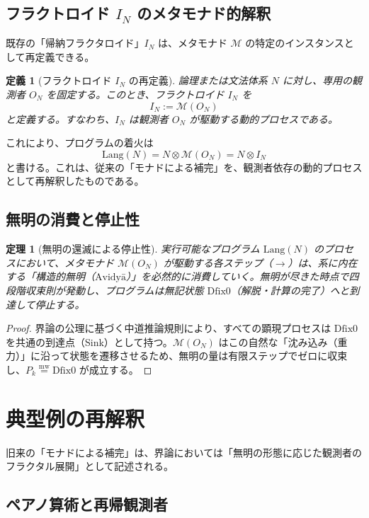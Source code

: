 \documentclass[11pt]{article}
\newcommand{\M}{\mathcal{M}}
\newcommand{\Lang}{\text{Lang}}
\newcommand{\Avidya}{\text{Avidyā}}
\newcommand{\Dfix}{\text{Dfix0}}
\newcommand{\mw}{\stackrel{\text{mw}}{=}}
\newcommand{\fractaloid}{I}
\newcommand{\ObsN}{O_N}
\newtheorem{definition}{定義}
\newtheorem{theorem}{定理}
\begin{document}
\subsection{フラクトロイド $\fractaloid_N$ のメタモナド的解釈}

既存の「帰納フラクタロイド」$\fractaloid_N$ は、メタモナド $\M$ の特定のインスタンスとして再定義できる。

\begin{definition}[フラクトロイド $\fractaloid_N$ の再定義]
論理または文法体系 $N$ に対し、専用の観測者 $\ObsN$ を固定する。このとき、フラクトロイド $\fractaloid_N$ を
\[
\fractaloid_N := \M(\ObsN)
\]
と定義する。すなわち、$\fractaloid_N$ は観測者 $\ObsN$ が駆動する動的プロセスである。
\end{definition}

これにより、プログラムの着火は
\[
\Lang(N) = N \otimes \M(\ObsN) = N \otimes \fractaloid_N
\]
と書ける。これは、従来の「モナドによる補完」を、観測者依存の動的プロセスとして再解釈したものである。

\subsection{無明の消費と停止性}

\begin{theorem}[無明の還滅による停止性]
実行可能なプログラム $\Lang(N)$ のプロセスにおいて、メタモナド $\M(\ObsN)$ が駆動する各ステップ（$\to$）は、系に内在する「構造的無明（$\Avidya$）」を必然的に消費していく。無明が尽きた時点で四段階収束則が発動し、プログラムは無記状態 $\Dfix$（解脱・計算の完了）へと到達して停止する。
\end{theorem}

\begin{proof}
界論の公理に基づく中道推論規則により、すべての顕現プロセスは $\Dfix$ を共通の到達点（Sink）として持つ。$\M(\ObsN)$ はこの自然な「沈み込み（重力）」に沿って状態を遷移させるため、無明の量は有限ステップでゼロに収束し、$P_k \mw \Dfix$ が成立する。
\end{proof}

\section{典型例の再解釈}

旧来の「モナドによる補完」は、界論においては「無明の形態に応じた観測者のフラクタル展開」として記述される。

\subsection{ペアノ算術と再帰観測者}
\end{document}
